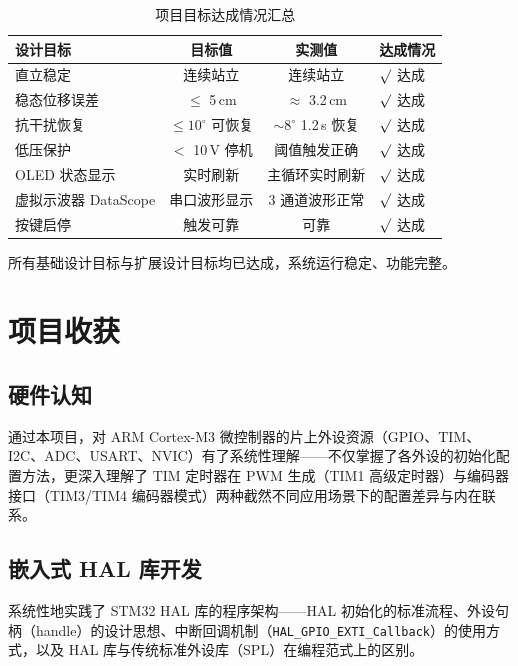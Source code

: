 \documentclass[12pt,a4paper,UTF8]{ctexrep}
\begin{document}
\begin{table}[H]
  \centering
  \caption{项目目标达成情况汇总}
  \label{tbl:completion}
  \begin{tabular}{p{3.5cm}ccp{3.5cm}}
    \toprule
    \textbf{设计目标} & \textbf{目标值} & \textbf{实测值} & \textbf{达成情况} \\
    \midrule
    直立稳定             & 连续站立      & 连续站立       & $\surd$ 达成 \\
    稳态位移误差         & $\leq$ 5\,cm  & $\approx$ 3.2\,cm & $\surd$ 达成 \\
    抗干扰恢复           & $\leq 10^{\circ}$ 可恢复 & $\sim 8^{\circ}$ 1.2\,s 恢复 & $\surd$ 达成 \\
    低压保护             & $<$ 10\,V 停机 & 阈值触发正确   & $\surd$ 达成 \\
    OLED 状态显示        & 实时刷新      & 主循环实时刷新 & $\surd$ 达成 \\
    虚拟示波器 DataScope & 串口波形显示  & 3 通道波形正常  & $\surd$ 达成 \\
    按键启停             & 触发可靠      & 可靠            & $\surd$ 达成 \\
    \bottomrule
  \end{tabular}
\end{table}

所有基础设计目标与扩展设计目标均已达成，系统运行稳定、功能完整。

\section{项目收获}

\subsection{硬件认知}

通过本项目，对 ARM Cortex-M3 微控制器的片上外设资源（GPIO、TIM、I2C、ADC、USART、NVIC）有了系统性理解——不仅掌握了各外设的初始化配置方法，更深入理解了 TIM 定时器在 PWM 生成（TIM1 高级定时器）与编码器接口（TIM3/TIM4 编码器模式）两种截然不同应用场景下的配置差异与内在联系。

\subsection{嵌入式 HAL 库开发}

系统性地实践了 STM32 HAL 库的程序架构——HAL 初始化的标准流程、外设句柄（handle）的设计思想、中断回调机制（\texttt{HAL\_GPIO\_EXTI\_Callback}）的使用方式，以及 HAL 库与传统标准外设库（SPL）在编程范式上的区别。
\end{document}
